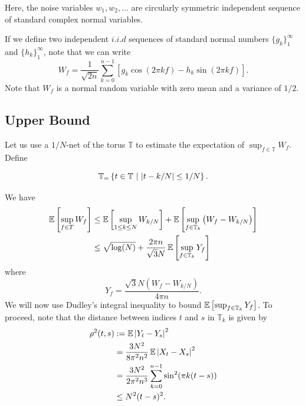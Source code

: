 Here, the noise variables $w_1, w_2, \ldots$ are circularly symmetric
independent sequence of standard complex normal variables.

If we define two independent $i.i.d$ sequences of standard normal numbers $\{
g_k\}_1^\infty$ and $\{h_k\}_1^\infty$, note that we can write
\begin{equation}
W_f = \frac{1}{\sqrt{2 n}} \sum_{k=0}^{n-1} \left[ g_k \cos(2 \pi k f) - h_k \sin(2\pi k f) \right].
\end{equation}
Note that $W_f$ is a normal random variable with zero mean and a variance of
$1/2$.

\subsection{Upper Bound}

Let us use a $1/N$-net of the torus $\mathbb{T}$ to estimate the expectation of
$\sup_{f \in \mathbb{T}} {W_f}$. Define

\begin{equation*}
\mathbb{T}_ = \left\{t \in \mathbb{T} ~ \middle| ~ \left|t-k/N\right| \leq 1/N \right\}.
\end{equation*}

We have
\begin{align}
\nonumber\operatorname{\mathbb{E}}\left[\sup_{f \in T} W_f \right] & \leq \operatorname{\mathbb{E}}\left[\sup_{1 \leq k \leq N} W_{k/N} \right] + \operatorname{\mathbb{E}}\left[\sup_{f \in \mathbb{T}_k} \left(W_{f} - W_{k/N}\right) \right]\\
& \leq \sqrt{\log(N)} + \frac{2 \pi n}{\sqrt{3}N} \operatorname{\mathbb{E}}\left[\sup_{f \in \mathbb{T}_k} Y_f \right]\label{balance}
\end{align}
where 
\begin{equation}
Y_f = \frac{\sqrt{3} N  \left(W_f - W_{k/N}\right)}{4 \pi n}.
\end{equation}
We will now use Dudley's integral inequality to bound $\operatorname{\mathbb{E}}\left[\sup_{f \in \mathbb{T}_k} Y_f \right]$. To proceed, note that the distance between indices $t$ and $s$ in $\mathbb{T}_k$ is given by
\begin{align*}
\rho^2(t,s) & := \operatorname{\mathbb{E}} \left|Y_t - Y_s\right|^2\\
& = \frac{3 N^2}{8 \pi^2 n^2} \operatorname{\mathbb{E}} \left|X_t - X_s\right|^2\\
& = \frac{3 N^2}{2 \pi^2 n^3} \sum_{k=0}^{n-1}{\sin^2(\pi k (t - s))}\\
& \leq N^2 (t-s)^2.
\end{align*}


